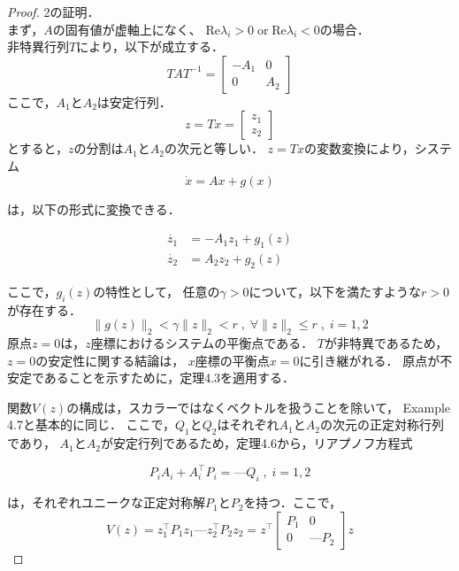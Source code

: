 \documentclass{jsarticle}
\begin{document}
\begin{proof}
2の証明．\\
まず，$A$の固有値が虚軸上になく、
$\text{Re}\lambda_i >0 \;\text{or} \;\text{Re}\lambda_i <0$の場合．\\
非特異行列$T$により，以下が成立する．
\begin{equation*}
  TAT^{-1} = \begin{bmatrix}
-A_1 & 0 \\
0 & A_2
\end{bmatrix}
\end{equation*}
ここで，$A_1$と$A_2$は安定行列．
\begin{equation*}
  z = Tx = \begin{bmatrix}
    z_1 \\ z_2
  \end{bmatrix}
\end{equation*}
とすると，$z$の分割は$A_1$と$A_2$の次元と等しい．
$z = Tx$の変数変換により，システム
\begin{equation*}
  \dot{x} = Ax + g(x)
\end{equation*}

は，以下の形式に変換できる．

\begin{align*}
\dot{z_1} &= -A_1z_1 + g_1(z) \\
\dot{z_2} &= A_2z_2 + g_2(z)
\end{align*}

ここで，$g_i(z)$の特性として，
任意の$\gamma >0$について，以下を満たすような$r>0$が存在する．
  \begin{equation*}
    \|g(z)\|_2<\gamma \|z\|_2<r \;,\;\forall \|z\|_2\leq r\;,\;i=1,2
  \end{equation*}
  原点$z = 0$は，$z$座標におけるシステムの平衡点である．
  $T$が非特異であるため，$z = 0$の安定性に関する結論は，
  $x$座標の平衡点$x = 0$に引き継がれる．
  原点が不安定であることを示すために，定理4.3を適用する．

  関数$V(z)$の構成は，スカラーではなくベクトルを扱うことを除いて，
  Example 4.7と基本的に同じ．
  ここで，$Q_1$と$Q_2$はそれぞれ$A_1$と$A_2$の次元の正定対称行列であり，
  $A_1$と$A_2$が安定行列であるため，定理4.6から，リアプノフ方程式

  \begin{equation*}
    P_iA_i + A_i^\top P_i = —Q_i\;,\; i = 1,2
  \end{equation*}
  
  は，それぞれユニークな正定対称解$P_1$と$P_2$を持つ．ここで，
  \begin{equation*}
    V(z) = z_1^\top P_1z_1 — z_2^\top P_2z_2 = z^\top\begin{bmatrix}
      P_1 &0\\ 
  0 & —P_2
    \end{bmatrix} z
  \end{equation*}
  

\end{proof}
\end{document}
